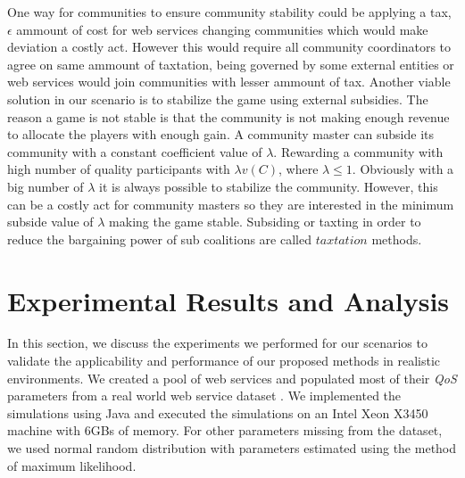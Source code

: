 One way for communities to ensure community stability could be applying a tax, $\epsilon$ ammount of cost for web services changing communities which would make deviation a costly act. However this would require all community coordinators to agree on same ammount of taxtation, being governed by some external entities or web services would join communities with lesser ammount of tax. Another viable solution in our scenario is to stabilize the game using external subsidies. The reason a game is not stable is that the community is not making enough revenue to allocate the players with enough gain. A community master can subside its community with a constant coefficient value of $\lambda$. Rewarding a community with high number of quality participants with $\lambda v(C)$, where $\lambda \leq 1$. Obviously with a big number of $\lambda$ it is always possible to stabilize the community. However, this can be a costly act for community masters so they are interested in the minimum subside value of $\lambda$ making the game stable. Subsiding or taxting in order to reduce the bargaining power of sub coalitions are called $taxtation$ \cite{eps346856} methods.






\section{Experimental Results and Analysis}\label{s:resutls}

In this section, we discuss the experiments we performed for our
scenarios to validate the applicability and performance of our
proposed methods in realistic environments. We created a pool of
web services and populated most of their \emph{QoS} parameters
from a real world web service dataset
\cite{DBLP:conf/smc/Al-MasriM09a}. We implemented the simulations
using Java and executed the simulations on an Intel Xeon X3450
machine with 6GBs of memory. For other parameters missing from the
dataset, we used normal random distribution with parameters
estimated using the method of maximum likelihood.

